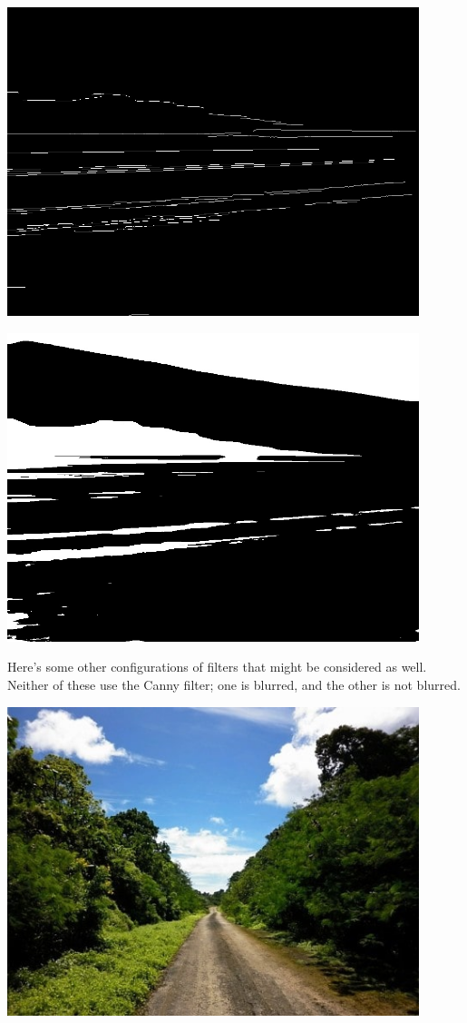 \documentclass[10pt,letterpaper,onecolumn,draftclsnofoot,journal]{IEEEtran}
\begin{document}
\par
\includegraphics[width=12cm,keepaspectratio]{canny}\vspace{.1cm}
\par
\includegraphics[width=12cm,keepaspectratio]{thresh}\vspace{.3cm}\vspace{.1cm}
\par
Here's some other configurations of filters that might be considered as well. Neither of these use the Canny filter; one is blurred, and the other is not blurred.\vspace{.3cm}
\par
\includegraphics[width=12cm,keepaspectratio]{road}\vspace{.1cm}
\end{document}
